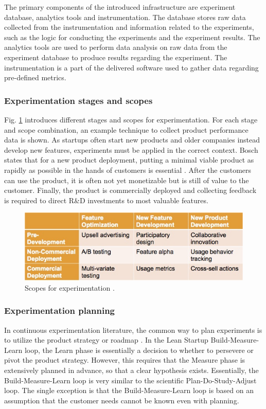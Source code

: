\documentclass[english]{tktltiki2}
\theoremstyle{definition}
\theoremstyle{remark}
\begin{document}
The primary components of the introduced infrastructure are experiment database, analytics tools and instrumentation. The database stores raw data collected from the instrumentation and information related to the experiments, such as the logic for conducting the experiments and the experiment results. The analytics tools are used to perform data analysis on raw data from the experiment database to produce results regarding the experiment. The instrumentation is a part of the delivered software used to gather data regarding pre-defined metrics.  

\subsubsection{Experimentation stages and scopes}
Fig. \ref{fig6} introduces different stages and scopes for experimentation. For each stage and scope combination, an example technique to collect product performance data is shown. As startups often start new products and older companies instead develop new features, experiments must be applied in the correct context. Bosch states that for a new product deployment, putting a minimal viable product as rapidly as possible in the hands of customers is essential \cite{bosch2012building}. After the customers can use the product, it is often not yet monetizable but is still of value to the customer. Finally, the product is commercially deployed and collecting feedback is required to direct R\&D investments to most valuable features.
\begin{figure}[h]
	\centering
	\includegraphics[width=5.0in]{scopes.jpg}
	\caption{Scopes for experimentation \cite{bosch2012building}.}
	\label{fig6}
\end{figure}

\subsubsection{Experimentation planning}
In continuous experimentation literature, the common way to plan experiments is to utilize the product strategy or roadmap \cite{ries2011lean, fagerholm2012building}. In the Lean Startup Build-Measure-Learn loop, the Learn phase is essentially a decision to whether to persevere or pivot the product strategy. However, this requires that the Measure phase is extensively planned in advance, so that a clear hypothesis exists. Essentially, the Build-Measure-Learn loop is very similar to the scientific Plan-Do-Study-Adjust loop. The single exception is that the Build-Measure-Learn loop is based on an assumption that the customer needs cannot be known even with planning. 
\end{document}
